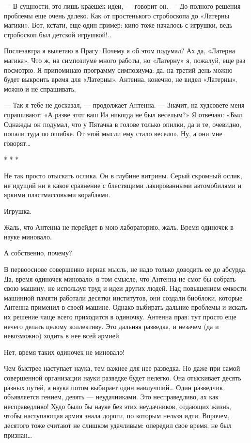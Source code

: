 — В сущности, это лишь  краешек идеи, — говорит  он. — До полного  решения
проблемы еще очень  далеко. Как  oт простенького  стробоскопа до  «Латерны
магики». Вот, кстати, еще один пример: кино тоже началось с игрушки,  ведь
стробоскоп был детской игрушкой!..

Послезавтра я вылетаю в Прагу. Почему  я об этом подумал? Ах да,  «Латерна
магика». Что ж, на симпозиуме много  работы, но «Латерну» я, пожалуй,  еще
раз посмотрю. Я припоминаю программу симпозиума: да, на третий день  можно
будет выкроить время для «Латерны». Антенна, конечно, не видел  «Латерны»,
можно и не спрашивать.

— Так я  тебе не досказал,  — продолжает Антенна.  — Значит, на  худсовете
меня спрашивают: «А разве этот ваш Иа никогда не был веселым?» Я  отвечаю:
«Был. Однажды он подумал, что у Пятачка  в голове только опилки, да и  те,
очевидно, попали туда по  ошибке. От этой мысли  ему стало весело». Ну,  а
они мне говорят…

* * *

Не так просто отыскать ослика. Он в глубине витрины. Серый скромный ослик,
не идущий ни в какое  сравнение с блестящими лакированными автомобилями  и
яркими пластмассовыми кораблями.

Игрушка.

Жаль, что Антенна не  перейдет в мою лабораторию,  жаль. Время одиночек  в
науке миновало.

А собственно, почему?

В первооснове  совершенно верная  мысль,  не надо  только доводить  ее  до
абсурда. Да, время одиночек миновало: в том смысле, что Антенна не смог бы
собрать свою машину, не используя труд и идеи других людей. Над повышением
емкости машинной памяти работали десятки институтов, они создали биоблоки,
которые Антенна применил в своей машине. Однако выбирать дальние  проблемы
и искать их решение  чаще всего приходится в  одиночку. Антенна прав:  тут
просто еще  нечего  делать  целому коллективу.  Это  дальняя  разведка,  и
незачем (да и невозможно) ходить в нее всей армией.

Нет, время таких одиночек не миновало!

Чем быстрее наступает  наука, тем  важнее для  нее разведка.  Но даже  при
самой совершенной организации науки разведке будет нелегко. Она отыскивает
десять разных путей, а наука потом выбирает один наилучший… Один разведчик
объявляется гением,  девять  —  неудачниками. Это  несправедливо,  ах  как
несправедливо! Худо было  бы науке без  этих неудачников, отдающих  жизнь,
чтобы наступающая армия  знала дороги,  по которым  нельзя идти.  Впрочем,
десятого тоже считают не  слишком удачливым: опередил  свое время, не  был
признан…

